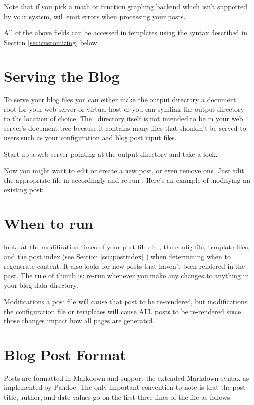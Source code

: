 \documentclass[11pt, letterpaper, oneside, titlepage]{book}
\begin{document}
Note that if you pick a math or function graphing backend which isn't
supported by your system,  will emit errors when processing
your posts.

All of the above fields can be accessed in templates using the syntax
described in Section \ref{sec:customizing} below.

\section{Serving the Blog}

To serve your blog files you can either make the output directory a
document root for your web server or virtual host or you can symlink
the output directory to the location of choice.  The
\mathblog\ directory itself is not intended to be in your web server's
document tree because it contains many files that shouldn't be served
to users such as your configuration and blog post input files.

Start up a web server pointing at the output directory and take a
look.

Now you might want to edit or create a new post, or even remove one.
Just edit the appropriate file in  accordingly and re-run
.  Here's an example of modifying an existing post:


\section{When to run }

 looks at the modification times of your post files in
, the config file, template files, and the post index (see
Section \ref{sec:postindex} ) when determining when to regenerate
content.  It also looks for new posts that haven't been rendered in
the past.  The rule of thumb is: re-run  whenever you make any
changes to anything in your blog data directory.

Modifications a post file will cause that post to be re-rendered, but
modifications the configuration file or templates will cause ALL posts
to be re-rendered since those changes impact how all pages are
generated.

\section{Blog Post Format}

Posts are formatted in Markdown and support the extended Markdown
syntax as implemented by Pandoc.  The only important convention to
note is that the post title, author, and date values go on the first
three lines of the file as follows:
\end{document}
